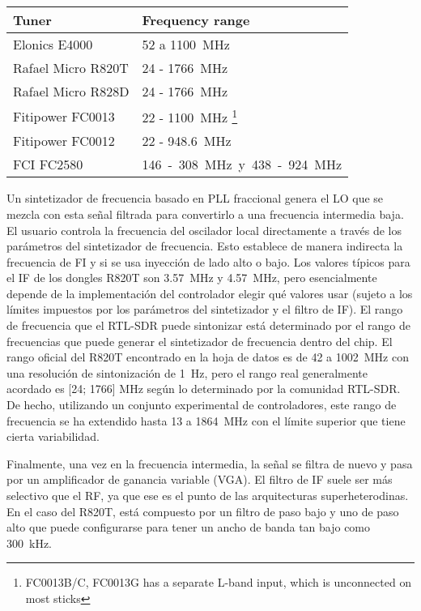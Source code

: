 \begin{table}[]
\begin{tabular}{|l|l|}
\hline

Tuner              &	Frequency range \\ \hline
Elonics E4000      &	\SI{52}{} a \SI{1100}{MHz}   \\ \hline
Rafael Micro R820T &	\SI{24}{} - \SI{1766}{MHz}  \\ \hline
Rafael Micro R828D &    \SI{24}{} - \SI{1766}{MHz}  \\ \hline
Fitipower FC0013   &	\SI{22}{} - \SI{1100}{MHz} \footnote{FC0013B/C, FC0013G has a separate L-band input, which is unconnected on most sticks} \\ \hline
Fitipower FC0012   &	\SI{22}{} - \SI{948.6}{MHz}  \\ \hline
FCI FC2580 	       &    \SI{146} - \SI{308}{MHz}  y \SI{438}{} - \SI{924}{MHz} \\ \hline

\end{tabular}
\end{table}

Un sintetizador de frecuencia basado en PLL fraccional genera el LO que se mezcla con esta señal filtrada para convertirlo a una frecuencia intermedia baja. 
El usuario controla la frecuencia del oscilador local directamente a través de los parámetros del sintetizador de frecuencia. 
Esto establece de manera indirecta la frecuencia de FI y si se usa inyección de lado alto o bajo. 
Los valores típicos para el IF de los dongles R820T son \SI{3.57}{MHz} y \SI{4.57}{MHz}, pero esencialmente depende de la implementación del controlador elegir qué valores usar (sujeto a los límites impuestos por los parámetros del sintetizador y el filtro de IF). 
El rango de frecuencia que el RTL-SDR puede sintonizar está determinado por el rango de frecuencias que puede generar el sintetizador de frecuencia dentro del chip. 
El rango oficial del R820T encontrado en la hoja de datos es de \SI{42}{} a \SI{1002}{MHz} con una resolución de sintonización de \SI{1}{Hz}, pero el rango real generalmente acordado es [24; 1766] MHz según lo determinado por la comunidad RTL-SDR. 
De hecho, utilizando un conjunto experimental de controladores, este rango de frecuencia se ha extendido hasta \SI{13}{} a \SI{1864}{MHz} con el límite superior que tiene cierta variabilidad.

Finalmente, una vez en la frecuencia intermedia, la señal se filtra de nuevo y pasa por un amplificador de ganancia variable (VGA). El filtro de IF suele ser más selectivo que el RF, ya que ese es el punto de las arquitecturas superheterodinas. En el caso del R820T, está compuesto por un filtro de paso bajo y uno de paso alto que puede configurarse para tener un ancho de banda tan bajo como \SI{300}{kHz}.

